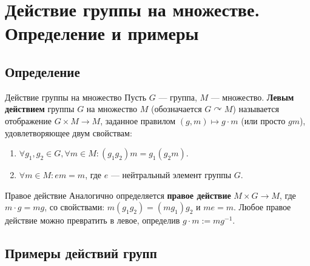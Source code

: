 \section{Действие группы на множестве. Определение и примеры}

\subsection*{Определение}

\begin{Definition}{Действие группы на множество}{}
	Пусть $G$ — группа, $M$ — множество.
	\textbf{Левым действием} группы $G$ на множество $M$ (обозначается $G \curvearrowright M$) называется отображение $G \times M \to M$, заданное правилом $(g, m) \mapsto g \cdot m$ (или просто $gm$), удовлетворяющее двум свойствам:
	\begin{enumerate}
		\item $\forall g_1, g_2 \in G, \forall m \in M \colon (g_1 g_2)m = g_1(g_2 m)$.
		\item $\forall m \in M \colon em = m$, где $e$ — нейтральный элемент группы $G$.
	\end{enumerate}
\end{Definition}

\begin{Remark}{Правое действие}{}
	Аналогично определяется \textbf{правое действие} $M \times G \to M$, где $m \cdot g = mg$, со свойствами: $m(g_1 g_2) = (mg_1)g_2$ и $me = m$.
	Любое правое действие можно превратить в левое, определив $g \cdot m := m g^{-1}$.
\end{Remark}

\subsection*{Примеры действий групп}

